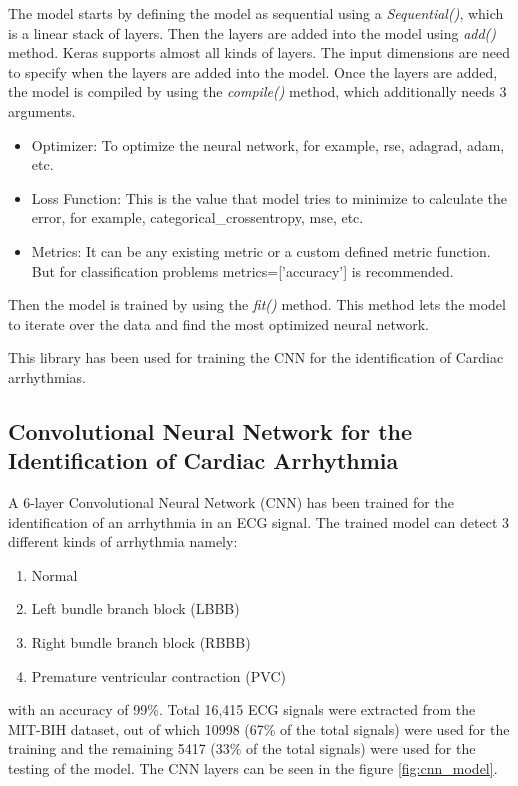 The model starts by defining the model as sequential using a \textit{Sequential()}, which is a linear stack of layers. Then the layers are added into the model using \textit{add()} method. Keras supports almost all kinds of layers. The input dimensions are need to specify when the layers are added into the model. Once the layers are added, the model is compiled by using the \textit{compile()} method, which additionally needs 3 arguments.

\begin{itemize}
	\item Optimizer: To optimize the neural network, for example, rse, adagrad, adam, etc.
	\item Loss Function: This is the value that model tries to minimize to calculate the error, for example, categorical\_crossentropy, mse, etc.
	\item Metrics: It can be any existing metric or a custom defined metric function. But for classification problems metrics=['accuracy'] is recommended.
\end{itemize}

Then the model is trained by using the \textit{fit()} method. This method lets the model to iterate over the data and find the most optimized neural network.

This library has been used for training the CNN for the identification of Cardiac arrhythmias.

\subsection{Convolutional Neural Network for the Identification of Cardiac Arrhythmia}
A 6-layer Convolutional Neural Network (CNN) has been trained for the identification of an arrhythmia in an ECG signal. The trained model can detect 3 different kinds of arrhythmia namely:

\begin{enumerate}
	\item Normal
	\item Left bundle branch block (LBBB)
	\item Right bundle branch block (RBBB)
	\item Premature ventricular contraction (PVC)
\end{enumerate}

 with an accuracy of 99\%. Total 16,415 ECG signals were extracted from the MIT-BIH dataset, out of which 10998 (67\% of the total signals) were used for the training and the remaining 5417 (33\% of the total signals) were used for the testing of the model. The CNN layers can be seen in the figure \ref{fig:cnn_model}.



